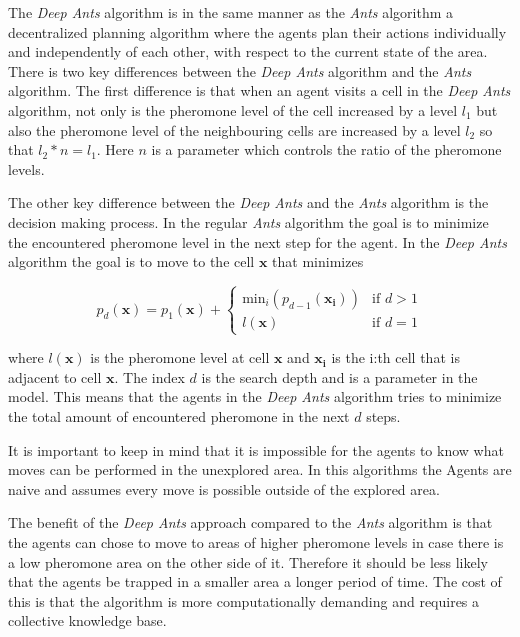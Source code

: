 \documentclass{article}
\begin{document}
The \textit{Deep Ants} algorithm is in the same manner as the \textit{Ants}
algorithm a decentralized planning algorithm where the agents plan their actions
individually and independently of each other, with respect to the current state
of the area. There is two key differences
between the \textit{Deep Ants} algorithm and the \textit{Ants} algorithm. The
first difference is that when an agent visits a cell in the \textit{Deep Ants}
algorithm, not only is the pheromone level of the cell increased by a level $l_1$ but also the
pheromone level of the neighbouring cells are increased by a level $l_2$ so that
$l_2 * n = l_1$. Here $n$ is a parameter which controls the ratio of the
pheromone levels. 

The other key difference between the \textit{Deep Ants} and the \textit{Ants}
algorithm is the decision making process. In the regular \textit{Ants} algorithm
the goal is to minimize the encountered pheromone level in the next step for the
agent. In the \textit{Deep Ants} algorithm the goal is to move to the cell
$\mathbf{x}$ that minimizes

$$ p_d(\mathbf{x}) = p_1(\mathbf{x}) + \begin{cases} \text{min}_i
  \left(p_{d-1}(\mathbf{x_i}) \right)  & \text{if } d > 1 \\
  l(\mathbf{x}) & \text{if } d = 1 \end{cases}$$

where $l(\mathbf{x})$ is the pheromone level at cell $\mathbf{x}$ and
$\mathbf{x_i}$ is the i:th cell that is adjacent to cell $\mathbf{x}$. The index
$d$ is the search depth and is a parameter in the model. This means that the
agents in the \textit{Deep Ants} algorithm tries to minimize the total amount of
encountered pheromone in the next $d$ steps.  

It is important to keep in mind that it is impossible for the agents to know
what moves can be performed in the unexplored area. In this algorithms the
Agents are naive and assumes every move is possible outside of the explored area.

The benefit of the \textit{Deep Ants} approach compared to the \textit{Ants}
algorithm is that the agents can chose to move to areas of higher pheromone
levels in case there is a low pheromone area on the other side of it. Therefore
it should be less likely that the agents be trapped in a smaller area a longer
period of time. The cost of this is that the algorithm is more computationally
demanding and requires a collective knowledge base.
\end{document}
